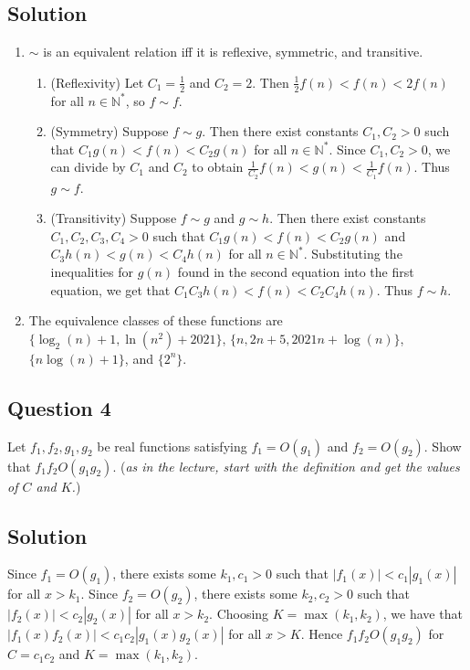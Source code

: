 \documentclass{article}
\begin{document}
\subsection*{Solution}
    \begin{enumerate}
        \item $\sim$ is an equivalent relation iff it is reflexive, symmetric, and transitive.
        \begin{enumerate}[label = \arabic*.]
            \item (Reflexivity) Let $C_{1} = \frac{1}{2}$ and $C_{2} = 2$. Then $\frac{1}{2}f(n) < f(n) < 2f(n)$ for all $n \in \mathbb{N^{*}}$, so $f \sim f$.
            \item (Symmetry) Suppose $f \sim g$. Then there exist constants $C_{1}, C_{2} > 0$ such that $C_{1}g(n) < f(n) < C_{2}g(n)$ for all $n \in \mathbb{N^{*}}$. Since $C_{1}, C_{2} > 0$, we can divide by $C_{1}$ and $C_{2}$ to obtain $\frac{1}{C_{2}}f(n) < g(n) < \frac{1}{C_{1}}f(n)$. Thus $g \sim f$.
            \item (Transitivity) Suppose $f \sim g$ and $g \sim h$. Then there exist constants $C_{1}, C_{2}, C_{3}, C_{4} > 0$ such that $C_{1}g(n) < f(n) < C_{2}g(n)$ and $C_{3}h(n) < g(n) < C_{4}h(n)$ for all $n \in \mathbb{N^{*}}$. Substituting the inequalities for $g(n)$ found in the second equation into the first equation, we get that $C_{1}C_{3}h(n) < f(n) < C_{2}C_{4}h(n)$. Thus $f \sim h$.
        \end{enumerate}
        \item The equivalence classes of these functions are $\{\log_{2}(n) + 1, \ln(n^{2}) + 2021\}$, $\{n, 2n + 5, 2021n + \log(n)\}$,  $\{n\log(n) + 1\}$, and $\{2^{n}\}$.
    \end{enumerate}

\subsection*{Question 4}
    Let $f_{1}, f_{2}, g_{1}, g_{2}$ be real functions satisfying $f_{1} = O(g_{1})$ and $f_{2} = O(g_{2})$. Show that $f_{1}f_{2} O(g_{1}g_{2})$. (\textit{as in the lecture, start with the definition and get the values of $C$ and $K$.})

\subsection*{Solution}
    Since $f_{1} = O(g_{1})$, there exists some $k_1, c_1 > 0$ such that $|f_{1}(x)| < c_{1}|g_{1}(x)|$ for all $x > k_{1}$. Since $f_{2} = O(g_{2})$, there exists some $k_{2}, c_{2} > 0$ such that $|f_{2}(x)| < c_{2}|g_{2}(x)|$ for all $x > k_{2}$. Choosing $K = \max(k_{1}, k_{2})$, we have that $|f_{1}(x)f_{2}(x)| < c_{1}c_{2}|g_{1}(x)g_{2}(x)|$ for all $x > K$. Hence $f_{1}f_{2}O(g_{1}g_{2})$ for $C = c_{1}c_{2}$ and $K = \max(k_{1}, k_{2})$.
\end{document}
